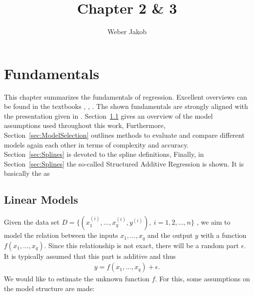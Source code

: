 \documentclass[10pt,a4paper]{report}
\title{Chapter 2 \& 3}
\author{Weber Jakob}
\begin{document}
\maketitle
\tableofcontents
\chapter{Fundamentals} \label{chap:fundamentals}

This chapter summarizes the fundamentals of regression. Excellent overviews can be found in the textbooks \cite{wood2017generalized}, \cite{fahrmeir2007regression}, \cite{friedman2001elements}. The shown fundamentals are strongly aligned with the presentation given in \cite{fahrmeir2007regression}. Section~\ref{sec:LinModel} gives an overview of the model assumptions used throughout this work, Furthermore, Section~\ref{sec:ModelSelection} outlines methods to evaluate and compare different models again each other in terms of complexity and accuracy. Section~\ref{sec:Splines} is devoted to the  spline definitions, Finally, in Section~\ref{sec:Splines} the so-called Structured Additive Regression is shown. It is basically the as

\section{Linear Models} \label{sec:LinModel}

Given the data set $D = \{ (x^{(i)}_1, \dots, x^{(i)}_q, y^{(i)}), \ i=1, 2, \dots, n\}$ , we aim to model the relation between the inputs $x_1, \dots, x_q$ and the output $y$ with a function $f(x_1, \dots, x_q)$. Since this relationship is not exact, there will be a random part $\epsilon$. It is typically assumed that this part is additive and thus  
\begin{align} \label{eq:model-structure}
	y = f(x_{1}, \dots, x_{q}) + \epsilon.
\end{align}
%
We would like to estimate the unknown function $f$. For this, some assumptions on the model structure are made:
\end{document}
